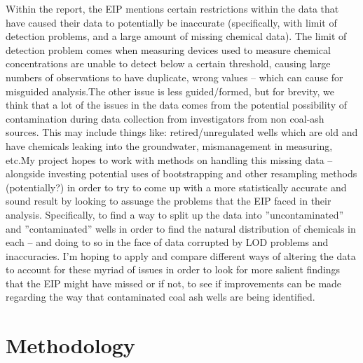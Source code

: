 \documentclass[12pt, twoside]{amherstthesis}
\begin{document}
Within the report, the EIP mentions certain restrictions within the data that have caused their data to potentially be inaccurate (specifically, with limit of detection problems, and a large amount of missing chemical data). The limit of detection problem comes when measuring devices used to measure chemical concentrations are unable to detect below a certain threshold, causing large numbers of observations to have duplicate, wrong values -- which can cause for misguided analysis.The other issue is less guided/formed, but for brevity, we think that a lot of the issues in the data comes from the potential possibility of contamination during data collection from investigators from non coal-ash sources. This may include things like: retired/unregulated wells which are old and have chemicals leaking into the groundwater, mismanagement in measuring, etc.My project hopes to work with methods on handling this missing data -- alongside investing potential uses of bootstrapping and other resampling methods (potentially?) in order to try to come up with a more statistically accurate and sound result by looking to assuage the problems that the EIP faced in their analysis. Specifically, to find a way to split up the data into ''uncontaminated'' and ''contaminated'' wells in order to find the natural distribution of chemicals in each -- and doing to so in the face of data corrupted by LOD problems and inaccuracies. I'm hoping to apply and compare different ways of altering the data to account for these myriad of issues in order to look for more salient findings that the EIP might have missed or if not, to see if improvements can be made regarding the way that contaminated coal ash wells are being identified.

\hypertarget{methodology}{%
\chapter{Methodology}\label{methodology}}
\end{document}
